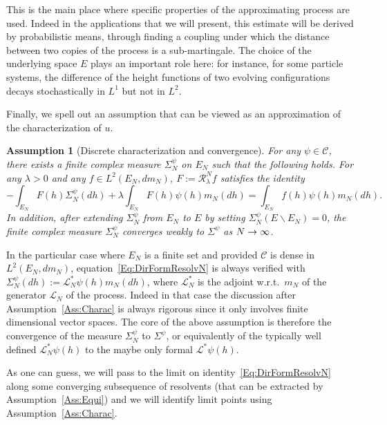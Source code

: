 \documentclass[AHL,Unicode,longabstracts]{cedram}
\theoremstyle{plain}
\newtheorem{assu}[cdrthm]{Assumption}}
\newcommand{\cC}{\mathcal{C}}
\newcommand{\cL}{\mathcal{L}}
\newcommand{\cR}{\mathcal{R}}
\renewcommand*{\to}{\mathchoice{\longrightarrow}{\rightarrow}{\rightarrow}{\rightarrow}}
\begin{document}
This is the main place where specific properties of the approximating process are used. Indeed in the applications that we will present, this estimate will be derived by probabilistic means, through finding a coupling under which the distance between two copies of the process is a sub-martingale. The choice of the underlying space $E$ plays an important role here: for instance, for some particle systems, the difference of the height functions of two evolving configurations decays stochastically in $L^1$ but not in $L^2$.

Finally, we spell out an assumption that can be viewed as an approximation of the characterization of $u$.

\begin{assu}[Discrete characterization and convergence]\label{Ass:IbPF}
For any $\psi \in \cC$, there exists a finite complex measure $\Sigma_N^{\psi}$ on $E_N$ such that the following holds. For any $\lambda > 0$ and any $f\in L^2(E_N,dm_N)$, $F:=\cR_\lambda^N f$ satisfies the identity
\begin{equation}\label{Eq:DirFormResolvN}
-\int_{E_N} F(h) \Sigma_N^{\psi}(dh) + \lambda \int_{E_N} F(h) \psi(h) m_N(dh) = \int_{E_N} f(h) \psi(h) m_N(dh).
\end{equation}
In addition, after extending $\Sigma_N^{\psi}$ from $E_N$ to $E$ by setting $\Sigma_N^{\psi}(E\backslash E_N)=0$, the finite complex measure $\Sigma_N^{\psi}$ converges weakly to $\Sigma^{\psi}$ as $N\to\infty$.
\end{assu}

In the particular case where $E_N$ is a finite set and provided $\cC$ is dense in\linebreak $L^2(E_N,dm_N)$, equation~\eqref{Eq:DirFormResolvN} is always verified with $\Sigma_N^{\psi}(dh) := \cL^*_N \psi(h) m_N(dh)$, where $\cL^*_N$ is the adjoint w.r.t.~$m_N$ of the generator $\cL_N$ of the process. Indeed in that case the discussion after Assumption~\ref{Ass:Charac} is always rigorous since it only involves finite dimensional vector spaces. The core of the above assumption is therefore the convergence of the measure $\Sigma_N^{\psi}$ to $\Sigma^{\psi}$, or equivalently of the typically well defined $\cL_N^* \psi(h)$ to the maybe only formal $\cL^* \psi(h)$.

As one can guess, we will pass to the limit on identity~\eqref{Eq:DirFormResolvN} along some converging subsequence of resolvents (that can be extracted by Assumption~\ref{Ass:Equi}) and we will identify limit points using Assumption~\ref{Ass:Charac}.
\end{document}
